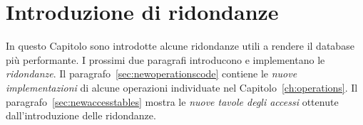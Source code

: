 \chapter{Introduzione di ridondanze}\label{ch:redundancies}
In questo Capitolo sono introdotte alcune ridondanze utili a rendere il database
più performante. I prossimi due paragrafi introducono e implementano le {\it ridondanze}. Il
paragrafo~\vref{sec:newoperationscode} contiene le {\it nuove implementazioni} di alcune operazioni
individuate nel Capitolo~\vref{ch:operations}. Il paragrafo~\vref{sec:newaccesstables} mostra
le {\it nuove tavole degli accessi} ottenute dall'introduzione delle ridondanze.




